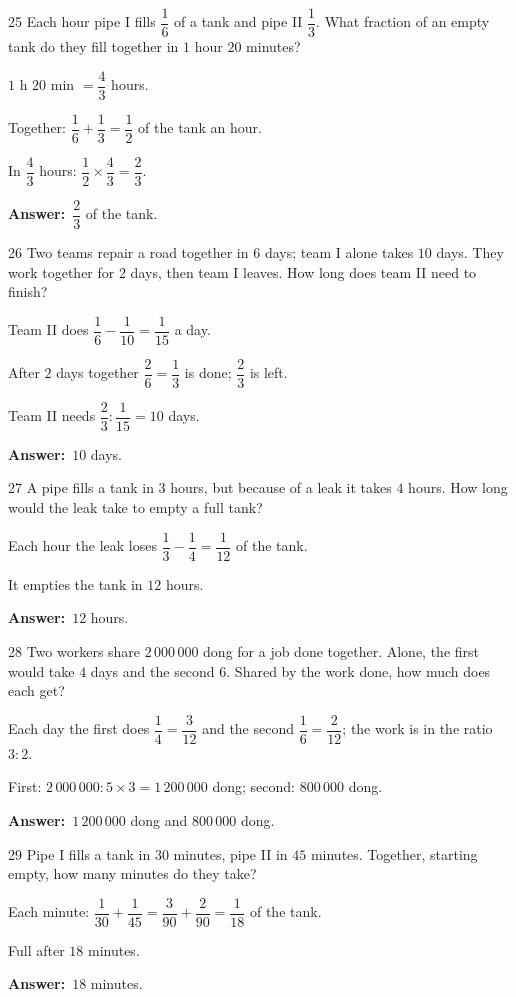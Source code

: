 \documentclass[11pt]{article}
\newif\ifsol \solfalse
\providecommand{\AnsWord}{Đáp số}
\newcommand{\dapso}[1]{\par\textbf{\AnsWord:}\ #1}
\newcommand{\probsol}[1]{%
  \begin{lrbox}{\solmeasure}\begin{minipage}{\dimexpr\linewidth-24pt\relax}#1\end{minipage}\end{lrbox}%
  \ifsol
    \begin{solbox}#1\end{solbox}%
  \else
    \setlength{\solht}{\dimexpr\ht\solmeasure+\dp\solmeasure+0.85cm\relax}%
    \ifdim\solht<1.35cm\setlength{\solht}{1.35cm}\fi
    \begin{tcolorbox}[colback=white,colframe=Line,boxrule=0.8pt,arc=5pt,
      left=8pt,right=8pt,top=4pt,bottom=4pt,height=\solht]{\footnotesize\color{Slate}\itshape\WorkWord}\end{tcolorbox}%
  \fi}
\newcommand{\gap}{\vspace{0.3cm}}
\def\WorkWord{Your work:}
\def\AnsWord{Answer}
\begin{document}
\gap
\begin{probbox}{25}{\relax}
Each hour pipe I fills $\dfrac16$ of a tank and pipe II $\dfrac13$. What fraction of an empty tank do they fill together in $1$ hour $20$ minutes?
\end{probbox}
\probsol{
$1$ h $20$ min $=\dfrac43$ hours.\par Together: $\dfrac16+\dfrac13=\dfrac12$ of the tank an hour.\par In $\dfrac43$ hours: $\dfrac12\times\dfrac43=\dfrac23$.
\dapso{$\dfrac23$ of the tank.}}
\gap
\begin{probbox}{26}{\relax}
Two teams repair a road together in $6$ days; team I alone takes $10$ days. They work together for $2$ days, then team I leaves. How long does team II need to finish?
\end{probbox}
\probsol{
Team II does $\dfrac16-\dfrac1{10}=\dfrac1{15}$ a day.\par After $2$ days together $\dfrac26=\dfrac13$ is done; $\dfrac23$ is left.\par Team II needs $\dfrac23:\dfrac1{15}=10$ days.
\dapso{$10$ days.}}
\gap
\begin{probbox}{27}{\relax}
A pipe fills a tank in $3$ hours, but because of a leak it takes $4$ hours. How long would the leak take to empty a full tank?
\end{probbox}
\probsol{
Each hour the leak loses $\dfrac13-\dfrac14=\dfrac1{12}$ of the tank.\par It empties the tank in $12$ hours.
\dapso{$12$ hours.}}
\gap
\begin{probbox}{28}{\relax}
Two workers share $2\,000\,000$ dong for a job done together. Alone, the first would take $4$ days and the second $6$. Shared by the work done, how much does each get?
\end{probbox}
\probsol{
Each day the first does $\dfrac14=\dfrac3{12}$ and the second $\dfrac16=\dfrac2{12}$; the work is in the ratio $3:2$.\par First: $2\,000\,000:5\times3=1\,200\,000$ dong; second: $800\,000$ dong.
\dapso{$1\,200\,000$ dong and $800\,000$ dong.}}
\gap
\begin{probbox}{29}{\relax}
Pipe I fills a tank in $30$ minutes, pipe II in $45$ minutes. Together, starting empty, how many minutes do they take?
\end{probbox}
\probsol{
Each minute: $\dfrac1{30}+\dfrac1{45}=\dfrac3{90}+\dfrac2{90}=\dfrac1{18}$ of the tank.\par Full after $18$ minutes.
\dapso{$18$ minutes.}}
\end{document}
